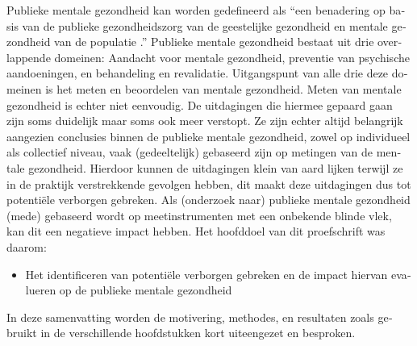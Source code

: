 \begin{otherlanguage}{dutch}
Publieke mentale gezondheid kan worden gedefineerd als ``een benadering op basis van de publieke gezondheidszorg van de geestelijke gezondheid en mentale gezondheid van de populatie \parencite{Davies_2014}.'' Publieke mentale gezondheid bestaat uit drie overlappende domeinen: Aandacht voor mentale gezondheid, preventie van psychische aandoeningen, en behandeling en revalidatie. Uitgangspunt van alle drie deze domeinen is het meten en beoordelen van mentale gezondheid. Meten van mentale gezondheid is echter niet eenvoudig. De uitdagingen die hiermee gepaard gaan zijn soms duidelijk maar soms ook meer verstopt. Ze zijn echter altijd belangrijk aangezien conclusies binnen de publieke mentale gezondheid, zowel op individueel als collectief niveau, vaak (gedeeltelijk) gebaseerd zijn op metingen van de mentale gezondheid. Hierdoor kunnen de uitdagingen klein van aard lijken terwijl ze in de praktijk verstrekkende gevolgen hebben, dit maakt deze uitdagingen dus tot potenti\"ele verborgen gebreken. Als (onderzoek naar) publieke mentale gezondheid (mede) gebaseerd wordt op meetinstrumenten met een onbekende blinde vlek, kan dit een negatieve impact hebben. Het hoofddoel van dit proefschrift was daarom:
\begin{itemize}
	\item Het identificeren van potenti\"ele verborgen gebreken en de impact hiervan evalueren op de publieke mentale gezondheid
\end{itemize} 
In deze samenvatting worden de motivering, methodes, en resultaten zoals gebruikt in de verschillende hoofdstukken kort uiteengezet en besproken.


\end{otherlanguage}
